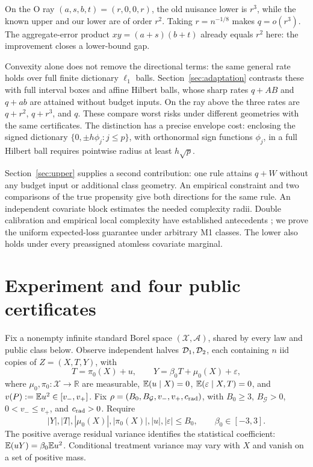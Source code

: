 \documentclass{article}
\theoremstyle{definition}
\theoremstyle{remark}
\begin{document}
On the O ray \((a,s,b,t)=(r,0,0,r)\), the old nuisance lower is \(r^3\), while the known upper and our lower are of order \(r^2\). Taking \(r=n^{-1/8}\) makes \(q=o(r^3)\). The aggregate-error product \(xy=(a+s)(b+t)\) already equals \(r^2\) here: the improvement closes a lower-bound gap.

Convexity alone does not remove the directional terms: the same general rate holds over full finite dictionary \(\ell_1\) balls. Section~\ref{sec:adaptation} contrasts these with full interval boxes and affine Hilbert balls, whose sharp rates \(q+AB\) and \(q+ab\) are attained without budget inputs. On the ray above the three rates are \(q+r^2\), \(q+r^3\), and \(q\). These compare worst risks under different geometries with the same certificates. The distinction has a precise envelope cost: enclosing the signed dictionary \(\{0,\pm h\phi_j:j\le p\}\), with orthonormal sign functions \(\phi_j\), in a full Hilbert ball requires pointwise radius at least \(h\sqrt p\).

Section~\ref{sec:upper} supplies a second contribution: one rule attains \(q+W\) without any budget input or additional class geometry. An empirical constraint and two comparisons of the true propensity give both directions for the same rule. An independent covariate block estimates the needed complexity radii. Double calibration and empirical local complexity have established antecedents \citep{liu2023doublecalibration,bartlett2005local}; we prove the uniform expected-loss guarantee under arbitrary M1 classes. The lower also holds under every preassigned atomless covariate marginal.

\section{Experiment and four public certificates}
\label{sec:setup}
Fix a nonempty infinite standard Borel space \((\mathcal X,\mathcal A)\), shared by every law and public class below. Observe independent halves \(\mathcal D_1,\mathcal D_2\), each containing \(n\) iid copies of \(Z=(X,T,Y)\), with
\begin{equation}
 T=\pi_0(X)+u,\qquad Y=\beta_0T+\mu_0(X)+\varepsilon,
 \label{eq:plm}
\end{equation}
where \(\mu_0,\pi_0:\mathcal X\to\mathbb R\) are measurable, \(\mathbb E(u\mid X)=0\), \(\mathbb E(\varepsilon\mid X,T)=0\), and \(v(P):=\mathbb E u^2\in[v_-,v_+]\). Fix
\(\rho=(B_0,B_{\mathcal G},v_-,v_+,c_{\rm rad})\), with \(B_0\ge3\), \(B_{\mathcal G}>0\), \(0<v_-\le v_+\), and \(c_{\rm rad}>0\). Require
\[
 |Y|,|T|,|\mu_0(X)|,|\pi_0(X)|,|u|,|\varepsilon|\le B_0,
 \qquad \beta_0\in[-3,3].
\]
The positive average residual variance identifies the statistical coefficient: \(\mathbb E(uY)=\beta_0\mathbb E u^2\). Conditional treatment variance may vary with \(X\) and vanish on a set of positive mass.
\end{document}

